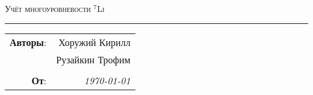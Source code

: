 
\begin{center}
    \LARGE \textsc{Учёт многоуровневости \texorpdfstring{${}^7$Li}{7Li}}
\end{center}

\hrule

\phantom{42}

\begin{flushright}
    \begin{tabular}{rr}
        \textbf{Авторы}: 
        & Хоружий Кирилл \\
        & Рузайкин Трофим \\
        & \\
        \textbf{От}: &
        \textit{\today}\\
    \end{tabular}
\end{flushright}

\thispagestyle{empty}
